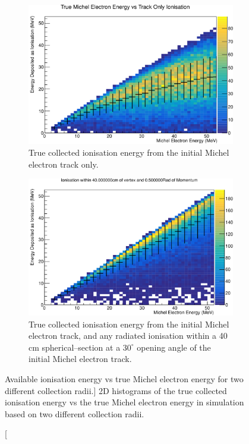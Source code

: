 \begin{figure}
	\centering

	\begin{subfigure}[b]{\textwidth}
		\includegraphics[clip, trim = 0cm 0cm 0cm 1cm, width=\textwidth]{figures/michel_track_only.pdf}
		\caption
		{True collected ionisation energy from the initial Michel electron track
		only.}
		\label{fig:track_only}
	\end{subfigure}

	\vspace{5mm}

	\begin{subfigure}[b]{\textwidth}
		\includegraphics[clip, trim = 0cm 0cm 0cm 1cm, width=\textwidth]{figures/cone_reco.pdf}
		\caption
		{True collected ionisation energy from the initial Michel electron track,
		and any radiated ionisation within a 40 cm spherical--section at a $30^\circ$ 
		opening angle of the initial Michel electron track.}
		\label{fig:cone_reco}
	\end{subfigure}

	\caption
	[Available ionisation energy vs true Michel electron energy for two different
	collection radii.]
	{2D histograms of the true collected ionisation energy vs the true Michel
	electron energy in \protodune{} simulation based on two different collection
	radii.}

	\label{fig:michel_track_only}

\end{figure}

